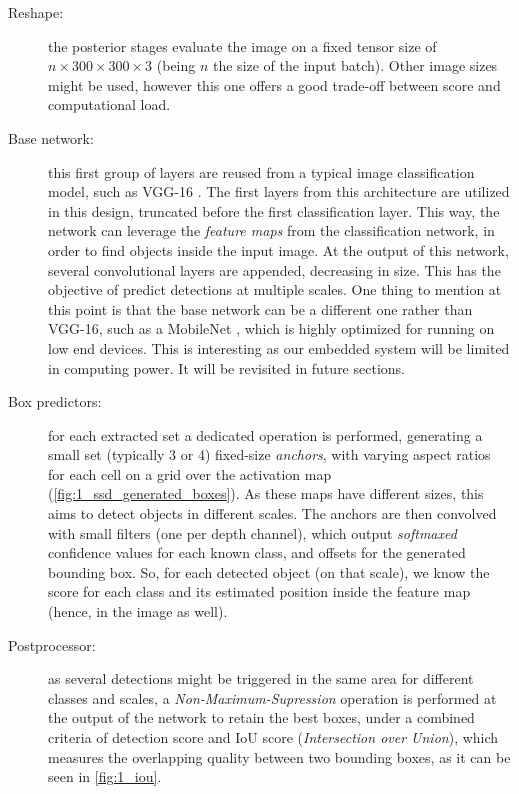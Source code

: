 \begin{description}
	
	\item[Reshape:] the posterior stages evaluate the image on a fixed tensor size of $n \times 300 \times 300 \times 3$ (being $n$ the size of the input batch). Other image sizes might be used, however this one offers a good trade-off between score and computational load.
	
	\item [Base network:] this first group of layers are reused from a typical image classification model, such as VGG-16 \cite{vgg16}. The first layers from this architecture are utilized in this design, truncated before the first classification layer. This way, the network can leverage the \textit{feature maps} from the classification network, in order to find objects inside the input image. At the output of this network, several convolutional layers are appended, decreasing in size. This has the objective of predict detections at multiple scales. One thing to mention at this point is that the base network can be a different one rather than VGG-16, such as a MobileNet \cite{mobilenet}, which is highly optimized for running on low end devices. This is interesting as our embedded system will be limited in computing power. It will be revisited in future sections.
	
	\item[Box predictors:] for each extracted set a dedicated operation is performed, generating a small set (typically 3 or 4) fixed-size \textit{anchors}, with varying aspect ratios for each cell on a grid over the activation map (\autoref{fig:1_ssd_generated_boxes}). As these maps have different sizes, this aims to detect  objects in different scales. The anchors are then convolved with small filters (one per depth channel), which output \emph{softmaxed} confidence values for each known class, and offsets for the generated bounding box. So, for each detected object (on that scale), we know the score for each class and its estimated position inside the feature map (hence, in the image as well).
	
	\item [Postprocessor:] as several detections might be triggered in the same area for different classes and scales, a \textit{Non-Maximum-Supression} \cite{nms} operation is performed at the output of the network to retain the best boxes, under a combined criteria of detection score and IoU score (\textit{Intersection over Union}), which measures the overlapping quality between two bounding boxes, as it can be seen in \autoref{fig:1_iou}.
\end{description}


